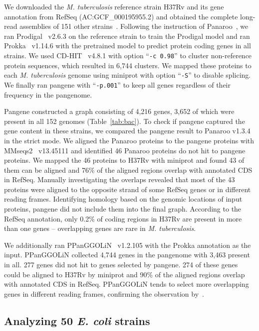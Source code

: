 \documentclass[webpdf,contemporary,large,namedate]{oup-authoring-template}%
\begin{document}
We downloaded the \emph{M. tuberculosis} reference strain H37Rv and its gene annotation from RefSeq (AC:GCF\_000195955.2)
and obtained the complete long-read assemblies of 151 other strains~\citep{Peker:2021aa,Marin:2022aa,Hall:2023aa}.
Following the instruction of Panaroo~\citep{Tonkin-Hill:2020aa},
we ran Prodigal~\citep{Hyatt:2010aa} v2.6.3 on the reference strain to train the Prodigal model
and ran Prokka~\citep{Seemann:2014aa} v1.14.6 with the pretrained model to predict protein coding genes in all strains.
We used CD-HIT~\citep{Li:2006aa,Fu:2012aa} v4.8.1 with option ``{\tt -c 0.98}'' to cluster non-reference protein sequences,
which resulted in 6,744 clusters.
We mapped these proteins to each \emph{M. tuberculosis} genome using miniprot with option ``{\tt -S}'' to disable splicing.
We finally ran pangene with ``{\tt -p.001}''
to keep all genes regardless of their frequency in the pangenome.

Pangene constructed a graph consisting of 4,216 genes,
3,652 of which were present in all 152 genomes (Table~\ref{tab:bac}).
To check if pangene captured the gene content in these strains,
we compared the pangene result to Panaroo v1.3.4 in the strict mode.
We aligned the Panaroo proteins to the pangene proteins with MMseqs2~\citep{Steinegger:2017aa} v13.45111
and identified 46 Panaroo proteins do not hit to pangene proteins.
We mapped the 46 proteins to H37Rv with miniprot
and found 43 of them can be aligned
and 76\% of the aligned regions overlap with annotated CDS in RefSeq.
Manually investigating the overlaps revealed that most of the 43 proteins
were aligned to the opposite strand of some RefSeq genes or in different reading frames.
Identifying homology based on the genomic locations of input proteins,
pangene did not include them into the final graph.
According to the RefSeq annotation,
only 0.2\% of coding regions in H37Rv are present in more than one genes --
overlapping genes are rare in \emph{M. tuberculosis}.

We additionally ran PPanGGOLiN~\citep{Gautreau:2020aa} v1.2.105 with the Prokka annotation as the input.
PPanGGOLiN collected 4,744 genes in the pangenome with 3,463 present in all.
277 genes did not hit to genes selected by pangene.
274 of these genes could be aligned to H37Rv by miniprot
and 90\% of the aligned regions overlap with annotated CDS in RefSeq.
PPanGGOLiN tends to select more overlapping genes in different reading frames,
confirming the observation by~\citet{Tonkin-Hill:2020aa}.

\subsection{Analyzing 50 \textit{E. coli} strains}
\end{document}
